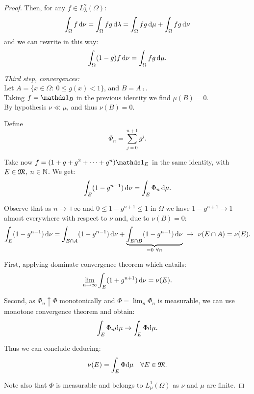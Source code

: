 \begin{proof}
	Then, for any $f \in L^2_\lambda(\Omega)$:
	$$
	\int_\Omega f \,\mathrm d \nu 
	= \int_\Omega f g \, \mathrm d \lambda 
	= \int_\Omega f g \, \mathrm d \mu + \int_\Omega f g \, \mathrm d \nu
	$$
	and we can rewrite in this way:
	$$
	\int_\Omega (1-g)f \, \mathrm d \nu 
	= \int_\Omega f g \, \mathrm d \mu.
	$$
	
	\textit{Third step, convergences:}\\
	Let $A = \{x \in \Omega : \ 0 \leq g(x) < 1 \}$, and $B = A\comp$.\\
	Taking $f= \Ind_B$ in the previous identity we find $\mu(B)=0$.\\
	By hypothesis $\nu \ll \mu$, and thus $\nu(B) = 0$.
	
	Define $$\Phi_n = \sum_{j=0}^{n+1} g^j.$$
	
	Take now $f=(1+g+g^2+\cdots+g^n)\Ind_E$ in the same identity, with $E \in \mathfrak M$, $n \in \mathbb N$. We get:
	$$
	\int_E(1-g^{n-1}) \,\mathrm d \nu 
	= \int_E\Phi_n \,\mathrm d \mu
	.
	$$
		
	Observe that as $n \to +\infty$ and $0 \leq 1-g^{n+1} \leq 1$ in $\Omega$ we have $1-g^{n+1} \to 1$ almost everywhere with respect to $\nu$ and, due to $\nu (B) = 0$:
	$$\int_E(1-g^{n-1}) \,\mathrm d \nu
	= \int_{E \cap A}(1-g^{n-1}) \,\mathrm d \nu
	+ \underbrace{\int_{E \cap B}(1-g^{n-1}) \,\mathrm d \nu}_{= 0 \ \forall n}
	\ \to \ \nu(E \cap A) 
	= \nu(E)
	.
	$$
	
	First, applying dominate convergence theorem which entails:
	$$
	\lim\limits_{n \to \infty} \int_E (1+g^{n+1}) \, \mathrm d \nu 
	= \nu(E)
	.
	$$
	
	Second, as $\Phi_n \uparrow \Phi$ monotonically and $\Phi = \lim_n \Phi_n$ is measurable, we can use monotone convergence theorem and obtain:
	$$
	\int_E \Phi_n \mathrm d \mu 
	\to \int_E \Phi \mathrm d \mu
	.
	$$
	
	Thus we can conclude deducing:
	$$
	\nu(E) 
	= \int_E \Phi \mathrm d \mu 
	\quad \forall E \in \mathfrak M
	.
	$$
	
	Note also that $\Phi$ is measurable and belongs to $L^1_\mu(\Omega)$ as $\nu$ and $\mu$ are finite.
\end{proof}
